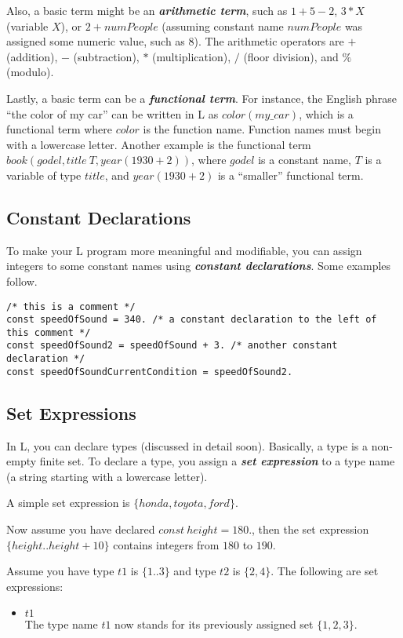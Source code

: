 \documentclass[letterpaper,10pt]{article}
\begin{document}
\begin{flushleft}
Also, a basic term might be an \textbf{\textit{arithmetic term}}, such as $1+5-2$, $3*X$ (variable $X$), or $2+numPeople$ (assuming constant name $numPeople$ was assigned some numeric value, such as $8$). The arithmetic operators are $+$ (addition), $-$ (subtraction), $*$ (multiplication), $/$ (floor division), and $\%$ (modulo).

Lastly, a basic term can be a \textbf{\textit{functional term}}. For instance, the English phrase ``the color of my car'' can be written in L as $color(my\_car)$, which is a functional term where $color$ is the function name. Function names must begin with a lowercase letter. Another example is the functional term \\ $book(godel, title~T, year(1930+2))$, where $godel$ is a constant name, $T$ is a variable of type $title$, and $year(1930+2)$ is a ``smaller'' functional term.

\subsection{Constant Declarations}\label{cd}

To make your L program more meaningful and modifiable, you can assign integers to some constant names using \textbf{\textit{constant declarations}}. Some examples follow.
\begin{verbatim}
/* this is a comment */
const speedOfSound = 340. /* a constant declaration to the left of this comment */
const speedOfSound2 = speedOfSound + 3. /* another constant declaration */
const speedOfSoundCurrentCondition = speedOfSound2. 
\end{verbatim}

\pagebreak


\subsection{Set Expressions}\label{sexpr}

In L, you can declare types (discussed in detail soon). Basically, a type is a non-empty finite set. To declare a type, you assign a \textbf{\textit{set expression}} to a type name (a string starting with a lowercase letter).

A simple set expression is $\{honda, toyota, ford\}$.

Now assume you have declared $const~height=180.$, then the set expression $\{height..height+10\}$ contains integers from $180$ to $190$.

Assume you have type $t1$ is $\{1..3\}$ and type $t2$ is $\{2,4\}$. The following are set expressions:
\begin{itemize}
\item
$t1$ \\
The type name $t1$ now stands for its previously assigned set $\{1,2,3\}$.


\end{itemize}
\end{flushleft}
\end{document}
